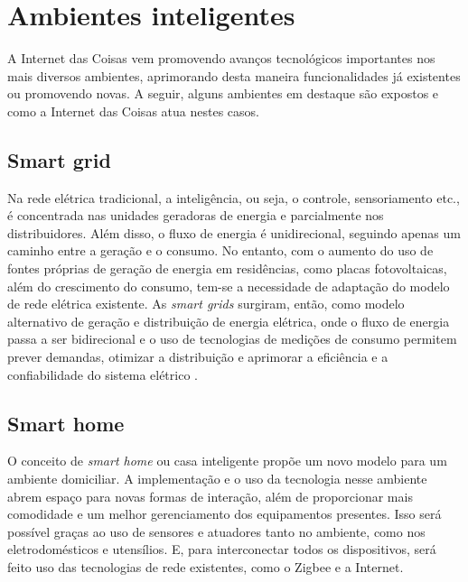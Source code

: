 \section{Ambientes inteligentes}

A Internet das Coisas vem promovendo avanços tecnológicos importantes nos mais diversos ambientes, aprimorando desta maneira funcionalidades já existentes ou promovendo novas. A seguir, alguns ambientes em destaque são expostos e como a Internet das Coisas atua nestes casos. 

\subsection{Smart grid}

Na rede elétrica tradicional, a inteligência, ou seja, o controle, sensoriamento etc., é concentrada nas unidades geradoras de energia e parcialmente nos distribuidores. Além disso, o fluxo de energia é unidirecional, seguindo apenas um caminho entre a geração e o consumo. No entanto, com o aumento do uso de fontes próprias de geração de energia em residências, como placas fotovoltaicas, além do crescimento do consumo, tem-se a necessidade de adaptação do modelo de rede elétrica existente. As \textit{smart grids} surgiram, então, como modelo alternativo de geração e distribuição de energia elétrica, onde o fluxo de energia passa a ser bidirecional e o uso de tecnologias de medições de consumo permitem prever demandas, otimizar a distribuição e aprimorar a eficiência e a confiabilidade do sistema elétrico \cite{Cecilia2016}. 


\subsection{Smart home}

O conceito de \textit{smart home} ou casa inteligente propõe um novo modelo para um ambiente domiciliar. A implementação e o uso da tecnologia nesse ambiente abrem espaço para novas formas de interação, além de proporcionar mais comodidade e um melhor gerenciamento dos equipamentos presentes. Isso será possível graças ao uso de sensores e atuadores tanto no ambiente, como nos eletrodomésticos e utensílios. E, para interconectar todos os dispositivos, será feito uso das tecnologias de rede existentes, como o Zigbee e a Internet.

